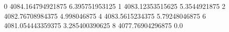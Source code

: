 0 4084.164794921875 6.395751953125
1 4083.12353515625 5.3544921875
2 4082.76708984375 4.998046875
4 4083.5615234375 5.79248046875
6 4081.054443359375 3.285400390625
8 4077.76904296875 0.0
